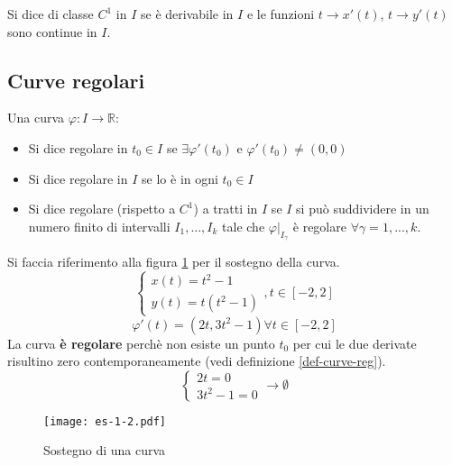 \begin{definition}[Classe]
Si dice di classe $C^1$ in $I$ se è derivabile in $I$ e le funzioni $t \rightarrow x'(t)$, $t \rightarrow y'(t)$ sono continue in $I$.
\end{definition}
\subsection{Curve regolari}
\begin{definition} \label{def-curve-reg}
Una curva $\varphi:I\rightarrow\mathbb{R}$:
\begin{itemize}
	\item Si dice regolare in $t_0\in I$ se $\exists \varphi ' (t_0)$ e $\varphi '(t_0)\neq (0, 0)$
	\item Si dice regolare in $I$ se lo è in ogni $t_0\in I$
	\item Si dice regolare (rispetto a $C^1$) a tratti in $I$ se $I$ si può suddividere in un numero finito di intervalli $I_1, ..., I_k$ tale che $\varphi | _ {I_\gamma}$ è regolare $\forall \gamma=1, ..., k$.
\end{itemize} 
\end{definition}


\begin{example}
Si faccia riferimento alla figura \ref{es-1-2} per il sostegno della curva.
\[
	\begin{cases}
	x(t) = t^2 - 1 \\
	y(t) = t(t^2 - 1)
	\end{cases}, t\in [-2, 2]
\]
\[
\varphi '(t) = (2t, 3t^2 - 1) \forall t \in [-2, 2]
\]
La curva \textbf{è regolare} perchè non esiste un punto $t_0$ per cui le due derivate risultino zero contemporaneamente (vedi definizione \ref{def-curve-reg}).
\[
	\begin{cases}
	2t=0 \\
	3t^2 - 1 = 0
	\end{cases} \rightarrow \emptyset
\]
\end{example}

\begin{figure}
	\texttt{[image: es-1-2.pdf]}
	\centering
	\caption{Sostegno di una curva}
	\label{es-1-2}
\end{figure}

